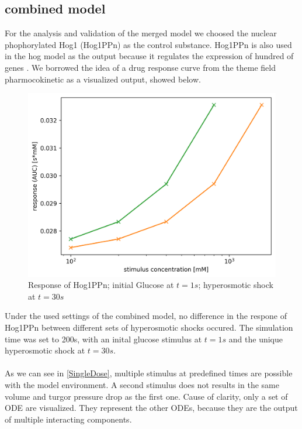 \subsection{combined model}
For the analysis and validation of the merged model we choosed the nuclear phophorylated Hog1 (Hog1PPn) as the control substance. Hog1PPn is also used in the hog model as the output because it regulates the expression of hundred of genes \cite{Zi_2010}. We borrowed the idea of a drug response curve from the theme field pharmocokinetic as a visualized output, showed below.  \\
\begin{figure}[h!]
	\begin{center}
		\begin{minipage}{0,8\textwidth}
			
			\includegraphics[width=\textwidth]{picture/Drug_response.png}
			\caption{Response of Hog1PPn; initial Glucose at $t=1s$; hyperosmotic shock at $t=30s$} 
			\label{DrugResponseCurve} 
		\end{minipage}
	\end{center}
\end{figure}
Under the used settings of the combined model, no difference in the respone of Hog1PPn between different sets of hyperosmotic shocks occured. The simulation time was set to 200s, with an inital glucose stimulus at $t=1s$ and the unique hyperosmotic shock at $t=30s$. \\\\
As we can see in \ref{SingleDose}, multiple stimulus at predefined times are possible with the model environment. A second stimulus does not results in the same volume and turgor pressure drop as the first one. Cause of clarity, only a set of ODE are visualized. They represent the other ODEs, because they are the output of multiple interacting components. 
